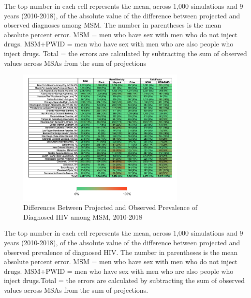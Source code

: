 \documentclass{article}
\begin{document}
The top number in each cell represents the mean, across 1,000 simulations and 9 years (2010-2018), of the absolute value of the difference between projected and observed diagnoses among MSM. The number in parentheses is the mean absolute percent error. \dag MSM = men who have sex with men who do not inject drugs. MSM+PWID = men who have sex with men who are also people who inject drugs. Total = the errors are calculated by subtracting the sum of observed values across MSAs from the sum of projections

\begin{figure}[H]
	\centering
	\caption{Differences Between Projected and Observed Prevalence of Diagnosed HIV among MSM, 2010-2018}
	\includegraphics[width=0.75\textwidth]{images/FigureS4}
\end{figure}

The top number in each cell represents the mean, across 1,000 simulations and 9 years (2010-2018), of the absolute value of the difference between projected and observed prevalence of diagnosed HIV. The number in parentheses is the mean absolute percent error. \dag MSM = men who have sex with men who do not inject drugs. MSM+PWID = men who have sex with men who are also people who inject drugs.Total = the errors are calculated by subtracting the sum of observed values across MSAs from the sum of projections.
\end{document}
